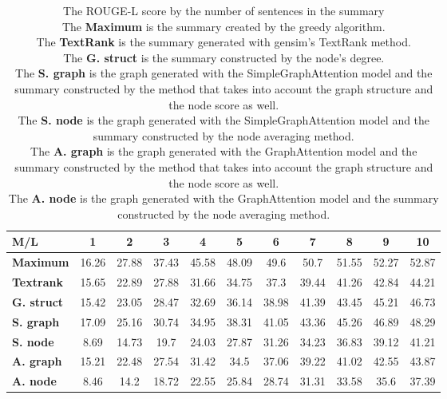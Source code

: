 \begin{table}[!ht]
	\centering
	\begin{tabular}{| l | c | c | c | c | c | c | c | c | c | c |}
		\hline
		\textbf{M/L}&\textbf{1}&\textbf{2}&\textbf{3}&\textbf{4}&\textbf{5}&\textbf{6}&\textbf{7}&\textbf{8}&\textbf{9}&\textbf{10} \\ \hline \hline
		\textbf{Maximum}&16.26&27.88&37.43&45.58&48.09&49.6&50.7&51.55&52.27&52.87 \\ \hline
		\textbf{Textrank}&15.65&22.89&27.88&31.66&34.75&37.3&39.44&41.26&42.84&44.21 \\ \hline
		\textbf{G. struct}&15.42&23.05&28.47&32.69&36.14&38.98&41.39&43.45&45.21&46.73 \\ \hline
		\textbf{S. graph}&17.09&25.16&30.74&34.95&38.31&41.05&43.36&45.26&46.89&48.29 \\ \hline
		\textbf{S. node}&8.69&14.73&19.7&24.03&27.87&31.26&34.23&36.83&39.12&41.21 \\ \hline
		\textbf{A. graph}&15.21&22.48&27.54&31.42&34.5&37.06&39.22&41.02&42.55&43.87 \\ \hline
		\textbf{A. node}&8.46&14.2&18.72&22.55&25.84&28.74&31.31&33.58&35.6&37.39 \\ \hline
	\end{tabular}
	\caption{The ROUGE-L score by the number of sentences in the summary
		\\ The \textbf{Maximum} is the summary created by the greedy algorithm.
		\\ The \textbf{TextRank} is the summary generated with gensim's TextRank method. 
		\\The \textbf{G. struct} is the summary constructed by the node's degree.
		\\ The \textbf{S. graph} is the graph generated with the SimpleGraphAttention model and the summary constructed by the method that takes into account the graph structure and the node score as well.
		\\ The \textbf{S. node} is the graph generated with the SimpleGraphAttention model and the summary constructed by the node averaging method.
		\\ The \textbf{A. graph} is the graph generated with the GraphAttention model and the summary constructed by the method that takes into account the graph structure and the node score as well.
		\\ The \textbf{A. node} is the graph generated with the GraphAttention model and the summary constructed by the node averaging method.}
	\label{tab:ROUGE-L}
\end{table}

